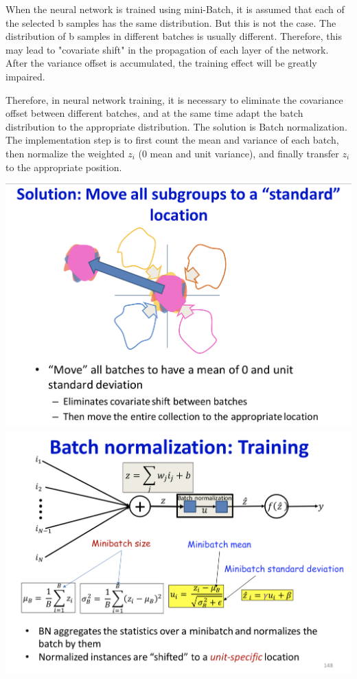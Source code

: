 \documentclass{article}
\begin{document}
	When the neural network is trained using mini-Batch, it is assumed that each of the selected b samples has the same distribution. But this is not the case. The distribution of b samples in different batches is usually different. Therefore, this may lead to "covariate shift" in the propagation of each layer of the network. After the variance offset is accumulated, the training effect will be greatly impaired.
	
	Therefore, in neural network training, it is necessary to eliminate the covariance offset between different batches, and at the same time adapt the batch distribution to the appropriate distribution. The solution is Batch normalization. The implementation step is to first count the mean and variance of each batch, then normalize the weighted $z_i$ (0 mean and unit variance), and finally transfer $z_i$ to the appropriate position.
	
	\includegraphics[scale=0.2]{104.png}
	\includegraphics[scale=0.2]{105.png}
	
\end{document}
